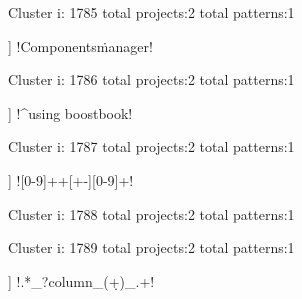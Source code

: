 Cluster i: 1785
total projects:2
total patterns:1
\begin{multicols}{1}
\begin{description}[noitemsep,topsep=0pt]
\item [[2] ] \cverb!Components\.manager!
\end{description}
\end{multicols}







Cluster i: 1786
total projects:2
total patterns:1
\begin{multicols}{1}
\begin{description}[noitemsep,topsep=0pt]
\item [[2] ] \cverb!^\s*using boostbook!
\end{description}
\end{multicols}







Cluster i: 1787
total projects:2
total patterns:1
\begin{multicols}{1}
\begin{description}[noitemsep,topsep=0pt]
\item [[2] ] \cverb![0-9]+\s+[+-][0-9]+!
\end{description}
\end{multicols}







Cluster i: 1788
total projects:2
total patterns:1
\begin{multicols}{1}
\end{multicols}







Cluster i: 1789
total projects:2
total patterns:1
\begin{multicols}{1}
\begin{description}[noitemsep,topsep=0pt]
\item [[2] ] \cverb!.*_?column_(\d+)_.+!
\end{description}
\end{multicols}







